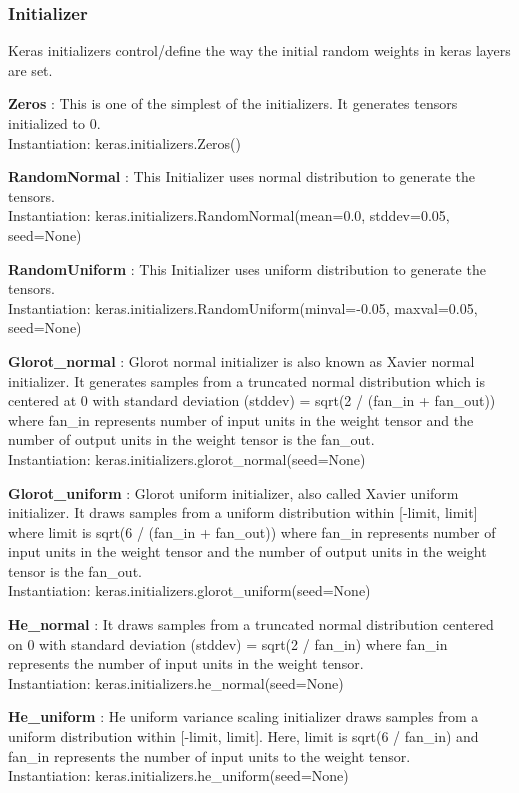\subsubsection{Initializer}
Keras initializers\cite{kerasinit} control/define the way the initial random weights in keras layers are set.

\textbf{Zeros} : This is one of the simplest of the initializers. It generates tensors initialized to 0.\\
Instantiation: keras.initializers.Zeros()

\textbf{RandomNormal} : This Initializer uses normal distribution to generate the tensors.\\
Instantiation: keras.initializers.RandomNormal(mean=0.0, stddev=0.05, seed=None)

\textbf{RandomUniform} : This Initializer uses uniform distribution to generate the tensors.\\
Instantiation: keras.initializers.RandomUniform(minval=-0.05, maxval=0.05,\\
 seed=None)

\textbf{Glorot\_normal} : Glorot normal initializer is also known as Xavier normal initializer. It generates samples from a truncated normal distribution which is centered at 0 with  
standard deviation (stddev) = sqrt(2 / (fan\_in + fan\_out)) where fan\_in represents number of input units in the weight tensor and the number of output units in the weight tensor is the fan\_out.\\
Instantiation: keras.initializers.glorot\_normal(seed=None)

\textbf{Glorot\_uniform} : Glorot uniform initializer, also called Xavier uniform initializer. It draws samples from a uniform distribution within [-limit, limit] 
where limit is sqrt(6 / (fan\_in + fan\_out)) where fan\_in represents number of input units in the weight tensor and the number of output units in the weight tensor is the fan\_out.\\
Instantiation: keras.initializers.glorot\_uniform(seed=None)

\textbf{He\_normal} : It draws samples from a truncated normal distribution centered on 0 with standard deviation (stddev) = sqrt(2 / fan\_in) where  fan\_in represents the number of 
input units in the weight tensor.\\
Instantiation: keras.initializers.he\_normal(seed=None)

\textbf{He\_uniform} : He uniform variance scaling initializer draws samples from a uniform distribution within [-limit, limit]. Here, limit is sqrt(6 / fan\_in) and fan\_in represents the number
of input units to the weight tensor.\\
Instantiation: keras.initializers.he\_uniform(seed=None)

